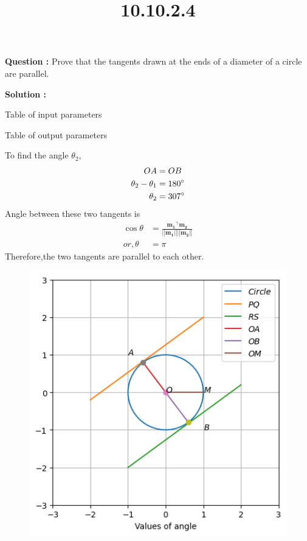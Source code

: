 \documentclass[12pt]{article}
\let\vec\mathbf
\providecommand{\norm}[1]{\ensuremath{\lvert|#1\rvert|}}
\begin{document}
\title{\textbf{10.10.2.4}}
\date{}
\maketitle
\textbf{Question :} Prove that the tangents drawn at the ends of a diameter of a circle are parallel.

\textbf{Solution :}
\begin{table}[H]
    \centering
    
    \caption{Table of input parameters}
    \label{tab:11.11.1.13.1}
\end{table}
\begin{table}[H]
    \centering
    
    \caption{Table of output parameters}
    \label{tab:11.11.1.13.2}
\end{table}
To find the angle $\theta_2$,
\begin{align}
    OA &=OB\\
    \theta_2- \theta_1&= 180\degree\\
    \theta_2 &= 307\degree
    \end{align}
Angle between these two tangents is
\begin{align}
    \cos{\theta}&=\frac{\vec{m_1}^{\top}\vec{m_2}}{\vec{\norm{m_1}\norm{m_2}}}\\
    or,\theta &= \pi
\end{align}
Therefore,the two tangents are parallel to each other.
\begin{figure}[H]                          
\centering                    
\includegraphics[width=\columnwidth]{fig/10.10.2.4.png}                      
\caption{}              
\label{10.10.2.4}
\end{figure}
\end{document}
